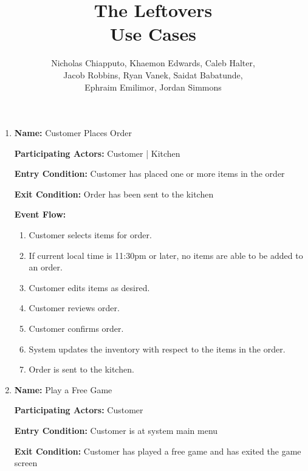 \documentclass[11pt]{article}
\begin{document}
	\title{ \vspace{-1in}The Leftovers \\
			\Large{Use Cases} }

	\author{	Nicholas Chiapputo, Khaemon Edwards, Caleb Halter, \\
				Jacob Robbins, Ryan Vanek, Saidat Babatunde, \\
				Ephraim Emilimor, Jordan Simmons
	}

	\maketitle

	\begin{enumerate}
		\item \textbf{Name:} 				Customer Places Order

			\textbf{Participating Actors:} 	Customer | Kitchen

			\textbf{Entry Condition:} 		Customer has placed one or more items in the order

			\textbf{Exit Condition:} 		Order has been sent to the kitchen

			\textbf{Event Flow:}
			\begin{enumerate}
				\setlength{\leftskip}{1cm}
				\item Customer selects items for order.
				\item If current local time is 11:30pm or later, no items are able to be added to an order.
				\item Customer edits items as desired.
				\item Customer reviews order.
				\item Customer confirms order.
				\item System updates the inventory with respect to the items in the order. 
				\item Order is sent to the kitchen.\\
			\end{enumerate}

		\item \textbf{Name:} 				Play a Free Game

			\textbf{Participating Actors:} 	Customer

			\textbf{Entry Condition:} 		Customer is at system main menu

			\textbf{Exit Condition:} 		Customer has played a free game and has exited the game screen 


\end{enumerate}
\end{document}
